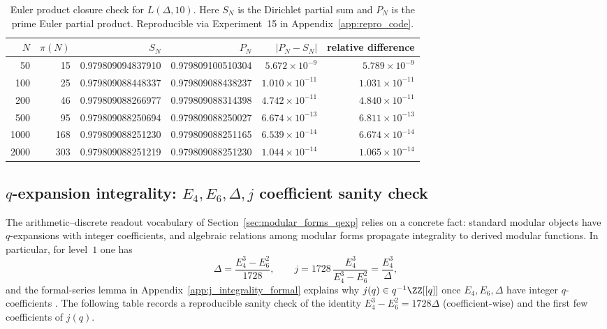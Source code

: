 \begin{table}[H]
\centering
\begin{tabular}{rrrrrr}
\toprule
$N$ & $\pi(N)$ & $S_N$ & $P_N$ & $|P_N-S_N|$ & relative difference \\
\midrule
50   & 15  & 0.979809094837910 & 0.979809100510304 & $5.672\times 10^{-9}$  & $5.789\times 10^{-9}$ \\
100  & 25  & 0.979809088448337 & 0.979809088438237 & $1.010\times 10^{-11}$ & $1.031\times 10^{-11}$ \\
200  & 46  & 0.979809088266977 & 0.979809088314398 & $4.742\times 10^{-11}$ & $4.840\times 10^{-11}$ \\
500  & 95  & 0.979809088250694 & 0.979809088250027 & $6.674\times 10^{-13}$ & $6.811\times 10^{-13}$ \\
1000 & 168 & 0.979809088251230 & 0.979809088251165 & $6.539\times 10^{-14}$ & $6.674\times 10^{-14}$ \\
2000 & 303 & 0.979809088251219 & 0.979809088251230 & $1.044\times 10^{-14}$ & $1.065\times 10^{-14}$ \\
\bottomrule
\end{tabular}
\caption{Euler product closure check for $L(\Delta,10)$. Here $S_N$ is the Dirichlet partial sum and $P_N$ is the prime Euler partial product. Reproducible via Experiment~15 in Appendix~\ref{app:repro_code}.}
\label{tab:delta_euler_product_closure}
\end{table}

\subsection{\texorpdfstring{$q$}{q}-expansion integrality: \texorpdfstring{$E_4,E_6,\Delta,j$}{E4,E6,Delta,j} coefficient sanity check}
\label{app:quant_fits_qexp_integrality}

The arithmetic--discrete readout vocabulary of Section~\ref{sec:modular_forms_qexp} relies on a concrete fact: standard modular objects have $q$-expansions with integer coefficients, and algebraic relations among modular forms propagate integrality to derived modular functions. In particular, for level~$1$ one has
\begin{equation}
\Delta=\frac{E_4^3-E_6^2}{1728},\qquad
j=1728\,\frac{E_4^3}{E_4^3-E_6^2}=\frac{E_4^3}{\Delta},
\end{equation}
and the formal-series lemma in Appendix~\ref{app:j_integrality_formal} explains why $j(q)\in q^{-1}\ZZ[[q]]$ once $E_4,E_6,\Delta$ have integer $q$-coefficients \cite{Serre1973,Apostol1990}. The following table records a reproducible sanity check of the identity $E_4^3-E_6^2=1728\Delta$ (coefficient-wise) and the first few coefficients of $j(q)$.


